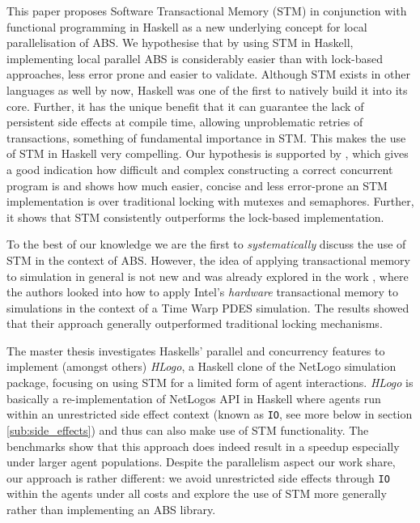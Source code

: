 This paper proposes Software Transactional Memory (STM) in conjunction with functional programming in Haskell \cite{hudak_history_2007} as a new underlying concept for local parallelisation of ABS. We hypothesise that by using STM in Haskell, implementing local parallel ABS is considerably easier than with lock-based approaches, less error prone and easier to validate. Although STM exists in other languages as well by now, Haskell was one of the first to natively build it into its core. Further, it has the unique benefit that it can guarantee the lack of persistent side effects at compile time, allowing unproblematic retries of transactions, something of fundamental importance in STM. This makes the use of STM in Haskell very compelling. 
Our hypothesis is supported by \cite{discolo_lock_2006}, which gives a good indication how difficult and complex constructing a correct concurrent program is and shows how much easier, concise and less error-prone an STM implementation is over traditional locking with mutexes and semaphores. Further, it shows that STM consistently outperforms the lock-based implementation.


\medskip

To the best of our knowledge we are the first to \textit{systematically} discuss the use of STM in the context of ABS. However, the idea of applying transactional memory to simulation in general is not new and was already explored in the work \cite{hay_experiments_2015}, where the authors looked into how to apply Intel’s \textit{hardware} transactional memory to simulations in the context of a Time Warp PDES simulation. The results showed that their approach generally outperformed traditional locking mechanisms.

The master thesis \cite{bezirgiannis_improving_2013} investigates Haskells' parallel and concurrency features to implement (amongst others) \textit{HLogo}, a Haskell clone of the NetLogo \cite{wilensky_introduction_2015} simulation package, focusing on using STM for a limited form of agent interactions. \textit{HLogo} is basically a re-implementation of NetLogos API in Haskell where agents run within an unrestricted side effect context (known as \texttt{IO}, see more below in section \ref{sub:side_effects}) and thus can also make use of STM functionality. The benchmarks show that this approach does indeed result in a speedup especially under larger agent populations. Despite the parallelism aspect our work share, our approach is rather different: we avoid unrestricted side effects through \texttt{IO} within the agents under all costs and explore the use of STM more generally rather than implementing an ABS library.

